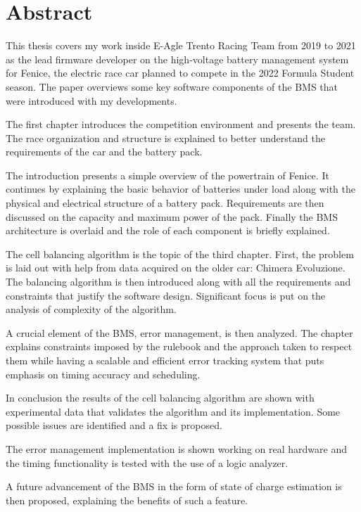 \chapter*{Abstract}
This thesis covers my work inside E-Agle Trento Racing Team from 2019 to 2021 as the lead firmware developer on the high-voltage battery management system for Fenice, the electric race car planned to compete in the 2022 Formula Student season. The paper overviews some key software components of the BMS that were introduced with my developments.

The first chapter introduces the competition environment and presents the team. The race organization and structure is explained to better understand the requirements of the car and the battery pack.

The introduction presents a simple overview of the powertrain of Fenice. It continues by explaining the basic behavior of batteries under load along with the physical and electrical structure of a battery pack. Requirements are then discussed on the capacity and maximum power of the pack. Finally the BMS architecture is overlaid and the role of each component is briefly explained.

The cell balancing algorithm is the topic of the third chapter. First, the problem is laid out with help from data acquired on the older car: Chimera Evoluzione. The balancing algorithm is then introduced along with all the requirements and constraints that justify the software design. Significant focus is put on the analysis of complexity of the algorithm.

A crucial element of the BMS, error management, is then analyzed. The chapter explains constraints imposed by the rulebook and the approach taken to respect them while having a scalable and efficient error tracking system that puts emphasis on timing accuracy and scheduling.

In conclusion the results of the cell balancing algorithm are shown with experimental data that validates the algorithm and its implementation. Some possible issues are identified and a fix is proposed.

The error management implementation is shown working on real hardware and the timing functionality is tested with the use of a logic analyzer.

A future advancement of the BMS in the form of state of charge estimation is then proposed, explaining the benefits of such a feature.

\newpage



